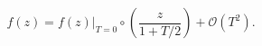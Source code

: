 \begin{equation} %
  f(z)  = f(z)\Big|_{T=0}\circ\left(\frac{z}{1+T/2}\right)+\mathcal{O}(T^2).
\end{equation} 
